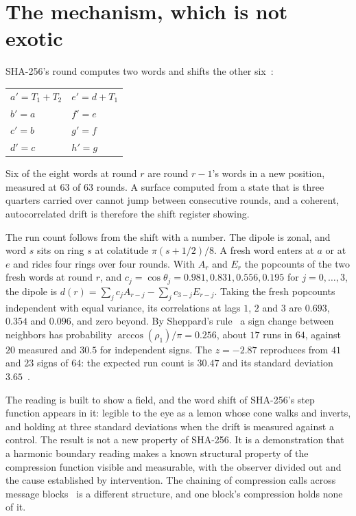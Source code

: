 \section{The mechanism, which is not exotic}

SHA-256's round computes two words and shifts the other six~\cite[Section~6.2.2]{src:FIPS-180-4}:

\begin{center}
\begin{tabular}{@{}ll@{}}
\toprule
\(a' = T_1 + T_2\) & \(e' = d + T_1\) \\
\(b' = a\) & \(f' = e\) \\
\(c' = b\) & \(g' = f\) \\
\(d' = c\) & \(h' = g\) \\
\bottomrule
\end{tabular}
\end{center}

Six of the eight words at round \(r\) are round \(r-1\)'s words in a new position, measured at \(63\) of \(63\) rounds. A surface computed from a state that is three quarters carried over cannot jump between consecutive rounds, and a coherent, autocorrelated drift is therefore the shift register showing.

The run count follows from the shift with a number. The dipole is zonal, and word \(s\) sits on ring \(s\) at colatitude \(\pi(s + 1/2)/8\). A fresh word enters at \(a\) or at \(e\) and rides four rings over four rounds. With \(A_r\) and \(E_r\) the popcounts of the two fresh words at round \(r\), and \(c_j = \cos\theta_j = 0.981, 0.831, 0.556, 0.195\) for \(j = 0, \dots, 3\), the dipole is \(d(r) = \sum_j c_j A_{r-j} - \sum_j c_{3-j} E_{r-j}\). Taking the fresh popcounts independent with equal variance, its correlations at lags \(1\), \(2\) and \(3\) are \(0.693\), \(0.354\) and \(0.096\), and zero beyond. By Sheppard's rule~\cite{src:Sheppard-1899} a sign change between neighbors has probability \(\arccos(\rho_1)/\pi = 0.256\), about \(17\) runs in \(64\), against \(20\) measured and \(30.5\) for independent signs. The \(z = -2.87\) reproduces from \(41\) and \(23\) signs of \(64\): the expected run count is \(30.47\) and its standard deviation \(3.65\)~\cite{src:Wald-and-Wolfowitz-1940}.

The reading is built to show a field, and the word shift of SHA-256's step function appears in it: legible to the eye as a lemon whose cone walks and inverts, and holding at three standard deviations when the drift is measured against a control. The result is not a new property of SHA-256. It is a demonstration that a harmonic boundary reading makes a known structural property of the compression function visible and measurable, with the observer divided out and the cause established by intervention. The chaining of compression calls across message blocks~\cite{src:Merkle-1990,src:Damgard-1990} is a different structure, and one block's compression holds none of it.

